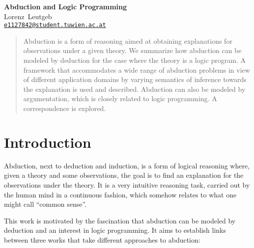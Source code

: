 \documentclass[a4paper]{article}
\begin{document}
\begin{center}

{\bfseries\Large{Abduction and Logic Programming}\\[3mm]}
Lorenz~Leutgeb \\ \href{mailto:e1127842@student.tuwien.ac.at}{\texttt{e1127842@student.tuwien.ac.at}}

\end{center}
\begin{abstract}
Abduction is a form of reasoning aimed at obtaining explanations for observations under a given theory. We summarize how abduction can be modeled by deduction for the case where the theory is a logic program. A framework that accommodates a wide range of abduction problems in view of different application domains by varying semantics of inference towards the explanation is used and described. Abduction can also be modeled by argumentation, which is closely related to logic programming. A correspondence is explored.
\end{abstract}

\section{Introduction}
\label{intro}

Abduction, next to deduction and induction, is a form of logical reasoning where, given a theory and some observations, the goal is to find an explanation for the observations under the theory. It is a very intuitive reasoning task, carried out by the human mind in a continuous fashion, which somehow relates to what one might call \enquote{common sense}.

This work is motivated by the fascination that abduction can be modeled by deduction and an interest in logic programming. It aims to establish links between three works that take different approaches to abduction:
\end{document}
